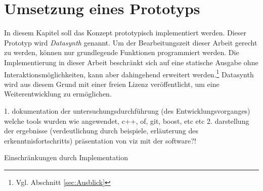 \documentclass[a4paper, 12pt, DIVcalc, onepage, pdftex, headsepline, footsepline]{scrreprt}
\begin{document}
\chapter{Umsetzung eines Prototyps}
\label{cha:Umsetzung}

In diesem Kapitel soll das Konzept prototypisch implementiert werden.
Dieser Prototyp wird \textit{Datasynth} genannt.
Um der Bearbeitungszeit dieser Arbeit gerecht zu werden, können nur grundlegende Funktionen
programmiert werden.  Die Implementierung in dieser Arbeit beschränkt sich auf eine
statische Ausgabe ohne Interaktionsmöglichkeiten, kann aber dahingehend erweitert werden.\footnote{Vgl. Abschnitt \ref{sec:Ausblick}}
Datasynth wird aus diesem Grund mit einer freien
Lizenz veröffentlicht, um eine Weiterentwicklung zu ermöglichen.


1. dokumentation der untersuchungsdurchführung (des Entwicklungsvorganges)
welche tools wurden wie angewendet, c++, of, git, boost, etc etc
2. darstellung der ergebnisse (verdeutlichung durch beispiele, erläuterung des erkenntnisfortschritts)
präsentation von viz mit der software?!

Einschränkungen durch Implementation
\end{document}
